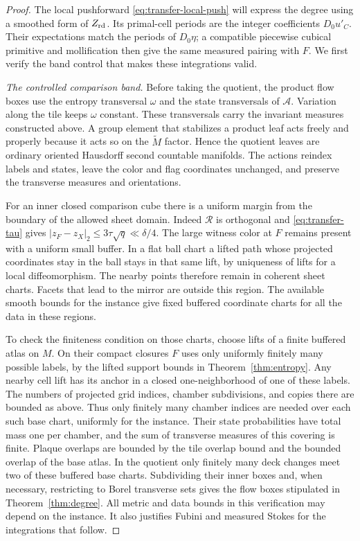 \begin{proof}
The local pushforward \eqref{eq:transfer-local-push} will express the
degree using a smoothed form of \(Z_{\rm rd}\).  Its primal-cell periods
are the integer coefficients \(D_0u'_C\).  Their expectations match the periods of
\(D_0\eta\); a compatible piecewise cubical primitive and mollification
then give the same measured pairing with \(F\).  We first verify the
band control that makes these integrations valid.

\emph{The controlled comparison band.}
Before taking the quotient, the product flow boxes use the entropy
transversal \(\omega\) and the
state transversals of \(\mathcal A\).  Variation along the tile keeps
\(\omega\) constant.  These transversals carry the invariant measures
constructed above.  A group element that stabilizes a product leaf
acts freely and properly because it acts so on the \(\widetilde M\)
factor.  Hence the quotient leaves are ordinary oriented Hausdorff
second countable manifolds.  The actions reindex labels and states,
leave the color and flag coordinates unchanged, and preserve the
transverse measures and orientations.

For an inner closed comparison cube there is a uniform margin from
the boundary of the allowed sheet domain.  Indeed \(\mathcal R\) is
orthogonal and \eqref{eq:transfer-tau} gives
\(|z_F-z_X|_2\leq3\tau\sqrt q\ll\delta/4\).  The large witness
color at \(F\) remains present with a uniform small buffer.  In a
flat ball chart a lifted path whose projected coordinates stay in
the ball stays in that same lift, by uniqueness of lifts for a local
diffeomorphism.  The nearby points therefore remain in coherent
sheet charts.  Facets that lead to the mirror are outside this region.
The available smooth bounds for the instance give fixed buffered
coordinate charts for all the data in these regions.

To check the finiteness condition on those charts, choose lifts of a
finite buffered atlas on \(M\).  On their compact closures \(F\) uses
only uniformly finitely many possible labels, by the lifted support
bounds in Theorem~\ref{thm:entropy}.  Any nearby cell lift has its
anchor in a closed one-neighborhood of one of these labels.  The
numbers of projected grid indices, chamber subdivisions, and copies
there are bounded as above.  Thus only finitely many chamber indices
are needed over each such base chart, uniformly for the instance.
Their state probabilities have total mass one per chamber, and the
sum of transverse measures of this covering is finite.  Plaque
overlaps are bounded by the tile overlap bound and the bounded
overlap of the base atlas.  In the quotient only finitely many deck
changes meet two of these buffered base charts.  Subdividing their
inner boxes and, when necessary, restricting to Borel transverse sets
gives the flow boxes stipulated in Theorem~\ref{thm:degree}.  All
metric and data bounds in this verification may depend on the
instance.  It also justifies Fubini and measured Stokes for the
integrations that follow.


\end{proof}
